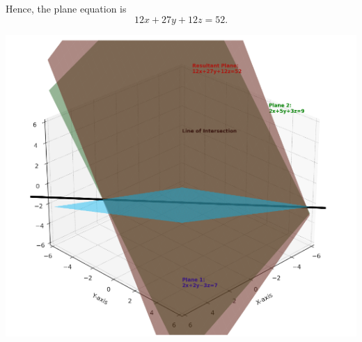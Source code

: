 \documentclass[journal]{IEEEtran}
\begin{document}
Hence, the plane equation is
\begin{equation}
12x + 27y + 12z = 52. 
\end{equation}
\begin{center}
    \includegraphics[width=0.8\columnwidth]{figs/plot8.png}
\end{center}
\end{document}
